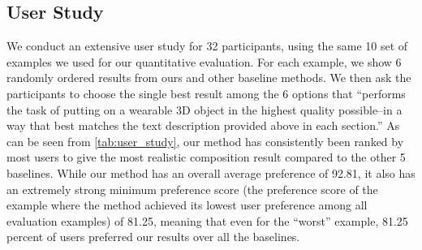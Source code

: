 \subsection{User Study}
\label{subsec:user_study}

We conduct an extensive user study for 32 participants, using the same 10 set of examples we used for our quantitative evaluation. For each example, we show 6 randomly ordered results from ours and other baseline methods. We then ask the participants to choose the single best result among the 6 options that ``performs the task of putting on a wearable 3D object in the highest quality possible--in a way that best matches the text description provided above in each section.''
As can be seen from \autoref{tab:user_study}, our method has consistently been ranked by most users to give the most realistic composition result compared to the other 5 baselines. While our method has an overall average preference of 92.81, it also has an extremely strong minimum preference score (the preference score of the example where the method achieved its lowest user preference among all evaluation examples) of 81.25, meaning that even for the ``worst'' example, 81.25 percent of users preferred our results over all the baselines.

\begin{table}[t]
\vspace{4mm}
\centering
\small
\setlength{\tabcolsep}{6pt}
\renewcommand{\arraystretch}{1.2}
\setlength{\aboverulesep}{0pt}
\setlength{\belowrulesep}{0pt}

\vspace{4mm}
\caption{User study results comparing six methods for the 3D wearable compositing task. Each entry reports the percentage of participant selections received by each method across all evaluation prompts (32 participants per prompt). We report the average preference percentage, as well as the minimum and maximum percentage achieved by each method on any individual example.}
\vspace{-2mm}
\label{tab:user_study}
\end{table}
\vspace{-3mm}
